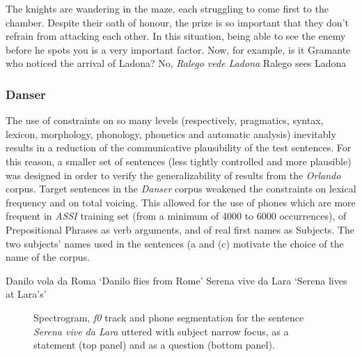 \eal
\ex The knights are wandering in the maze, each struggling to come first to the chamber. Despite their oath of honour, the prize is so important that they don't refrain from attacking each other. In this situation, being able to see the enemy before he spots you is a very important factor. Now, for example, is it Gramante who noticed the arrival of Ladona?  
\ex No, \textit{Ralego vede Ladona}
\ex Ralego sees Ladona
\zl

\subsubsection{Danser}\label{sec4212}
The use of constraints on so many levels (respectively, pragmatics, syntax, lexicon, morphology, phonology, phonetics and automatic analysis) inevitably results in a reduction of the communicative plausibility of the test sentences. For this reason, a smaller set of sentences (less tightly controlled and more plausible) was designed in order to verify the generalizability of results from the \textit{Orlando} corpus. Target sentences in the \textit{Danser} corpus weakened the constraints on lexical frequency and on total voicing. This allowed for the use of phones which are more frequent in \textit{ASSI} training set (from a minimum of 4000 to 6000 occurrences), of Prepositional Phrases as verb arguments, and of real first names as Subjects. The two subjects' names used in the sentences (a and (c) motivate the choice of the name of the corpus.

\eal
\ex Danilo vola da Roma
\ex `Danilo flies from Rome'
\ex Serena vive da Lara
\ex `Serena lives at Lara's'
\zl

\begin{figure}
\centering
{}
\caption{Spectrogram, \textit{f0} track and phone segmentation for the sentence \textit{Serena vive da Lara} uttered with subject narrow focus, as a statement (top panel) and as a question (bottom panel).}
\label{fig401}\end{figure}

